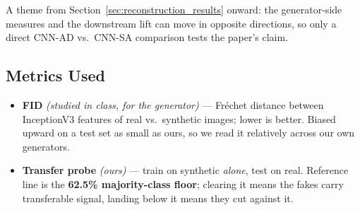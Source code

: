 \documentclass[11pt]{article}
\begin{document}

\noindent A theme from Section~\ref{sec:reconstruction_results} onward: the generator-side measures and the downstream lift can move in opposite directions, so only a direct CNN-AD vs.\ CNN-SA comparison tests the paper's claim.

\subsection{Metrics Used}
\begin{itemize}[nosep, leftmargin=1.5em]
  \item \textbf{FID} \emph{(studied in class, for the generator)} --- Fr\'{e}chet distance between InceptionV3 features of real vs.\ synthetic images; lower is better. Biased upward on a test set as small as ours, so we read it relatively across our own generators.
  \item \textbf{Transfer probe} \emph{(ours)} --- train on synthetic \emph{alone}, test on real. Reference line is the \textbf{62.5\% majority-class floor}; clearing it means the fakes carry transferable signal, landing below it means they cut against it.
\end{itemize}
\end{document}
